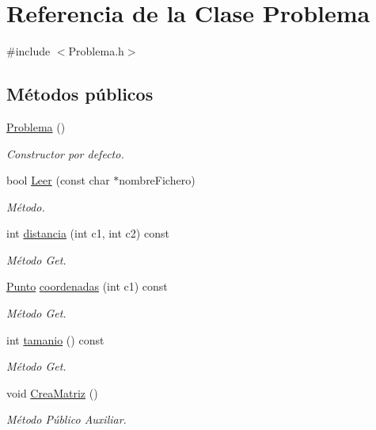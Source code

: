 \hypertarget{class_problema}{}\section{Referencia de la Clase Problema}
\label{class_problema}


{\ttfamily \#include $<$Problema.\+h$>$}

\subsection*{Métodos públicos}
\begin{DoxyCompactItemize}
\item 
\hyperlink{class_problema_a9d81af5f3f42a1b4354ad8f3c022fca3}{Problema} ()
\begin{DoxyCompactList}\small\item\em Constructor por defecto. \end{DoxyCompactList}\item 
bool \hyperlink{class_problema_adafab71affe601ae2c2ed7044edcd5f8}{Leer} (const char $\ast$nombre\+Fichero)
\begin{DoxyCompactList}\small\item\em Método. \end{DoxyCompactList}\item 
int \hyperlink{class_problema_afceb99f491e5c89c028bc7fe568b9e7a}{distancia} (int c1, int c2) const 
\begin{DoxyCompactList}\small\item\em Método Get. \end{DoxyCompactList}\item 
\hyperlink{class_punto}{Punto} \hyperlink{class_problema_a5e13dd9f70cdc628b1af2c9e86210dd0}{coordenadas} (int c1) const 
\begin{DoxyCompactList}\small\item\em Método Get. \end{DoxyCompactList}\item 
int \hyperlink{class_problema_ada03c7fad394755e16d3cb1028cae674}{tamanio} () const 
\begin{DoxyCompactList}\small\item\em Método Get. \end{DoxyCompactList}\item 
void \hyperlink{class_problema_ac25e6286f7dc7851dee7a6fda1025843}{Crea\+Matriz} ()
\begin{DoxyCompactList}\small\item\em Método Público Auxiliar. \end{DoxyCompactList}\item 

\end{DoxyCompactItemize}
